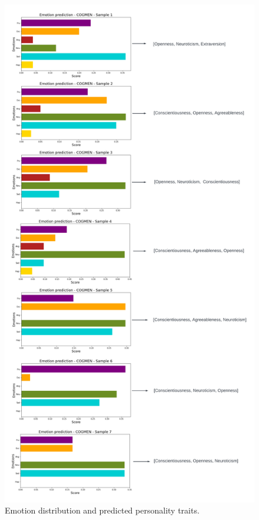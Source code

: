 \begin{figure}[h!]
  \centering
  \includegraphics[width=\linewidth, height=0.9\textheight]{figures/emotion_personality_7.png}
  \caption{Emotion distribution and predicted personality traits.}
  \label{fig:emotion_personality_all}
\end{figure}

